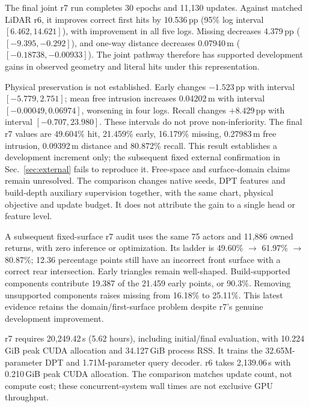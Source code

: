 \begin{table}[t]
\centering\scriptsize
\caption{Completed joint r7 minus LiDAR r6 on five paired development logs. Geometry/hit gains coexist with unresolved free-space preservation.}
\label{tab:r7}
\end{table}
The final joint r7 run completes 30 epochs and 11,130 updates. Against matched LiDAR r6, it improves correct first hits by 10.536\,pp (95\% log interval $[6.462,14.621]$), with improvement in all five logs. Missing decreases 4.379\,pp ($[-9.395,-0.292]$), and one-way distance decreases 0.07940\,m ($[-0.18738,-0.00933]$). The joint pathway therefore has supported development gains in observed geometry and literal hits under this representation.

Physical preservation is not established. Early changes $-1.523$\,pp with interval $[-5.779,2.751]$; mean free intrusion increases 0.04202\,m with interval $[-0.00049,0.06974]$, worsening in four logs. Recall changes $+8.429$\,pp with interval $[-0.707,23.980]$. These intervals do not prove non-inferiority. The final r7 values are 49.604\% hit, 21.459\% early, 16.179\% missing, 0.27983\,m free intrusion, 0.09392\,m distance and 80.872\% recall. This result establishes a development increment only; the subsequent fixed external confirmation in Sec.~\ref{sec:external} fails to reproduce it. Free-space and surface-domain claims remain unresolved. The comparison changes native seeds, DPT features and build-depth auxiliary supervision together, with the same chart, physical objective and update budget. It does not attribute the gain to a single head or feature level.

A subsequent fixed-surface r7 audit uses the same 75 actors and 11,886 owned returns, with zero inference or optimization. Its ladder is 49.60\% $\to$ 61.97\% $\to$ 80.87\%; 12.36 percentage points still have an incorrect front surface with a correct rear intersection. Early triangles remain well-shaped. Build-supported components contribute 19.387 of the 21.459 early points, or 90.3\%. Removing unsupported components raises missing from 16.18\% to 25.11\%. This latest evidence retains the domain/first-surface problem despite r7's genuine development improvement.

r7 requires 20,249.42\,s (5.62 hours), including initial/final evaluation, with 10.224\,GiB peak CUDA allocation and 34.127\,GiB process RSS. It trains the 32.65M-parameter DPT and 1.71M-parameter query decoder. r6 takes 2,139.06\,s with 0.210\,GiB peak CUDA allocation. The comparison matches update count, not compute cost; these concurrent-system wall times are not exclusive GPU throughput.
